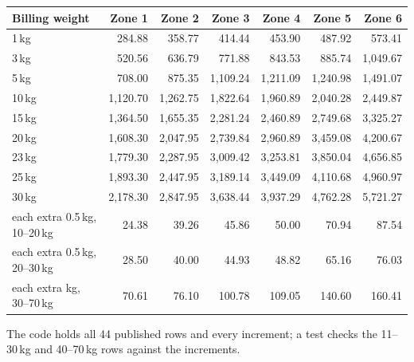 \documentclass[11pt,a4paper]{article}
\begin{document}
\begin{center}
\small
{}
\begin{tabular}{@{}lrrrrrr@{}}
  \toprule
  Billing weight & Zone 1 & Zone 2 & Zone 3 & Zone 4 & Zone 5 & Zone 6 \\
  \midrule
  1\,kg & 284.88 & 358.77 & 414.44 & 453.90 & 487.92 & 573.41 \\
  3\,kg & 520.56 & 636.79 & 771.88 & 843.53 & 885.74 & 1{,}049.67 \\
  5\,kg & 708.00 & 875.35 & 1{,}109.24 & 1{,}211.09 & 1{,}240.98 & 1{,}491.07 \\
  10\,kg & 1{,}120.70 & 1{,}262.75 & 1{,}822.64 & 1{,}960.89 & 2{,}040.28 & 2{,}449.87 \\
  15\,kg & 1{,}364.50 & 1{,}655.35 & 2{,}281.24 & 2{,}460.89 & 2{,}749.68 & 3{,}325.27 \\
  20\,kg & 1{,}608.30 & 2{,}047.95 & 2{,}739.84 & 2{,}960.89 & 3{,}459.08 & 4{,}200.67 \\
  23\,kg & 1{,}779.30 & 2{,}287.95 & 3{,}009.42 & 3{,}253.81 & 3{,}850.04 & 4{,}656.85 \\
  25\,kg & 1{,}893.30 & 2{,}447.95 & 3{,}189.14 & 3{,}449.09 & 4{,}110.68 & 4{,}960.97 \\
  30\,kg & 2{,}178.30 & 2{,}847.95 & 3{,}638.44 & 3{,}937.29 & 4{,}762.28 & 5{,}721.27 \\
  each extra 0.5\,kg, 10--20\,kg & 24.38 & 39.26 & 45.86 & 50.00 & 70.94 & 87.54 \\
  each extra 0.5\,kg, 20--30\,kg & 28.50 & 40.00 & 44.93 & 48.82 & 65.16 & 76.03 \\
  each extra kg, 30--70\,kg & 70.61 & 76.10 & 100.78 & 109.05 & 140.60 & 160.41 \\
  \bottomrule
\end{tabular}
\end{center}
The code holds all 44 published rows and every increment; a test checks the 11--30\,kg and
40--70\,kg rows against the increments.
\end{document}
